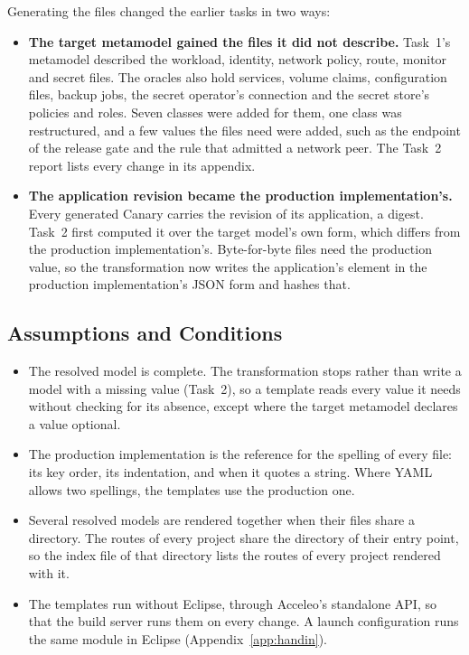 Generating the files changed the earlier tasks in two ways:

\begin{itemize}
  \item \textbf{The target metamodel gained the files it did not describe.}
    Task~1's metamodel described the workload, identity, network policy,
    route, monitor and secret files. The oracles also hold services, volume
    claims, configuration files, backup jobs, the secret operator's connection
    and the secret store's policies and roles. Seven classes were added for
    them, one class was restructured, and a few values the files need were
    added, such as the endpoint of the release gate and the rule that admitted
    a network peer. The Task~2 report lists every change in its appendix.
  \item \textbf{The application revision became the production
    implementation's.} Every generated Canary carries the revision of its
    application, a digest. Task~2 first computed it over the target model's own
    form, which differs from the production implementation's. Byte-for-byte
    files need the production value, so the transformation now writes the
    application's element in the production implementation's JSON form and
    hashes that.
\end{itemize}

\subsection{Assumptions and Conditions}
\label{sec:assumptions}

\begin{itemize}
  \item The resolved model is complete. The transformation stops rather than
    write a model with a missing value (Task~2), so a template reads every
    value it needs without checking for its absence, except where the target
    metamodel declares a value optional.
  \item The production implementation is the reference for the spelling of
    every file: its key order, its indentation, and when it quotes a string.
    Where YAML allows two spellings, the templates use the production one.
  \item Several resolved models are rendered together when their files share a
    directory. The routes of every project share the directory of their entry
    point, so the index file of that directory lists the routes of every
    project rendered with it.
  \item The templates run without Eclipse, through Acceleo's standalone API, so
    that the build server runs them on every change. A launch configuration
    runs the same module in Eclipse (Appendix~\ref{app:handin}).
\end{itemize}

